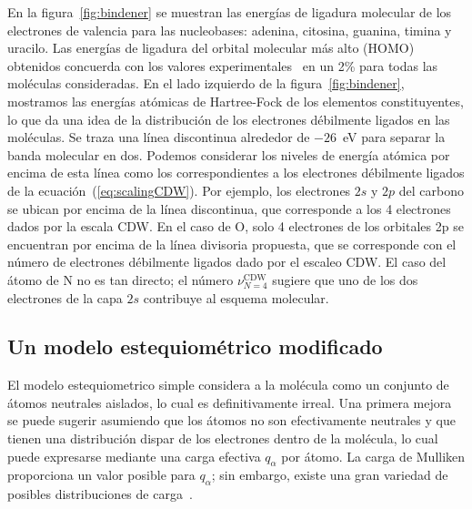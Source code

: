 En la figura~\ref{fig:bindener} se muestran las energías de ligadura 
molecular de los electrones de valencia para las nucleobases: adenina, 
citosina, guanina, timina y uracilo. Las energías de ligadura del orbital 
molecular más alto (HOMO) obtenidos concuerda con los valores
experimentales~\cite{Hush,Verkin,Dougherty} en un 2\% para todas las 
moléculas consideradas. En el lado izquierdo de la figura~\ref{fig:bindener}, 
mostramos las energías atómicas de Hartree-Fock de los elementos 
constituyentes, lo que da una idea de la distribución de los electrones
débilmente ligados en las moléculas. Se traza una línea discontinua 
alrededor de $-26$~eV para separar la banda molecular en dos. Podemos 
considerar los niveles de energía atómica por encima de esta línea como 
los correspondientes a los electrones débilmente ligados de la 
ecuación~(\ref{eq:scalingCDW}). Por ejemplo, los electrones $2s$ y $2p$ 
del carbono se ubican por encima de la línea discontinua, que corresponde 
a los 4 electrones dados por la escala CDW. En el caso de O, solo 4 
electrones de los orbitales 2p se encuentran por encima de la línea 
divisoria propuesta, que se corresponde con el número de electrones
débilmente ligados dado por el escaleo CDW. El caso del átomo de N no 
es tan directo; el número $\nu_{N=4}^{\text{CDW}}$ sugiere que uno de 
los dos electrones de la capa $2s$ contribuye al esquema molecular.

\subsection{Un modelo estequiométrico modificado}

El modelo estequiometrico simple considera a la molécula como un 
conjunto de átomos neutrales aislados, lo cual es definitivamente irreal.
Una primera mejora se puede sugerir asumiendo que los átomos no son
efectivamente neutrales y que tienen una distribución dispar de los 
electrones dentro de la molécula, lo cual puede expresarse mediante una
carga efectiva $q_{\alpha}$ por átomo. La carga de Mulliken proporciona
un valor posible para $q_{\alpha}$; sin embargo, existe una gran variedad
de posibles distribuciones de carga~\cite{lee2003}.

